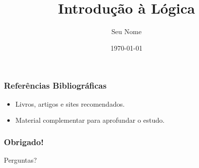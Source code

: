 \documentclass{beamer}
\title{Introdução à Lógica}
\author{Seu Nome}
\institute{Sua Instituição}
\date{\today}
\begin{document}
\begin{frame}
  \titlepage
\end{frame}



\begin{frame}
  \frametitle{Referências Bibliográficas}

  \begin{itemize}
    \item Livros, artigos e sites recomendados.
    \item Material complementar para aprofundar o estudo.
  \end{itemize}
\end{frame}

\begin{frame}
  \frametitle{Obrigado!}

  \begin{center}
    Perguntas?
  \end{center}
\end{frame}
\end{document}
